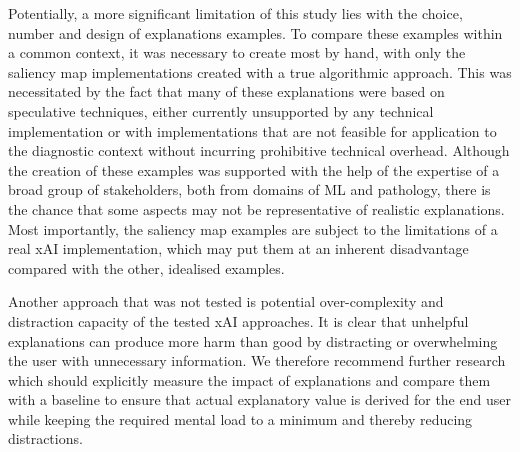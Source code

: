 

Potentially, a more significant limitation of this study lies with the choice, number and design of explanations examples. To compare these examples within a common context, it was necessary to create most by hand, with only the saliency map implementations created with a true algorithmic approach. This was necessitated by the fact that many of these explanations were based on speculative techniques, either currently unsupported by any technical implementation or with implementations that are not feasible for application to the diagnostic context without incurring prohibitive technical overhead. Although the creation of these examples was supported with the help of the expertise of a broad group of stakeholders, both from domains of ML and pathology, there is the chance that some aspects may not be representative of realistic explanations. Most importantly, the saliency map examples are subject to the limitations of a real xAI implementation, which may put them at an inherent disadvantage  compared with the other, idealised examples.

Another approach that was not tested is potential over-complexity and distraction capacity of the tested xAI approaches. It is clear that unhelpful explanations can produce more harm than good by distracting or overwhelming the user with unnecessary information. We therefore recommend further research which should explicitly measure the impact of explanations and compare them with a baseline to ensure that actual explanatory value is derived for the end user while keeping the required mental load to a minimum and thereby reducing distractions.

